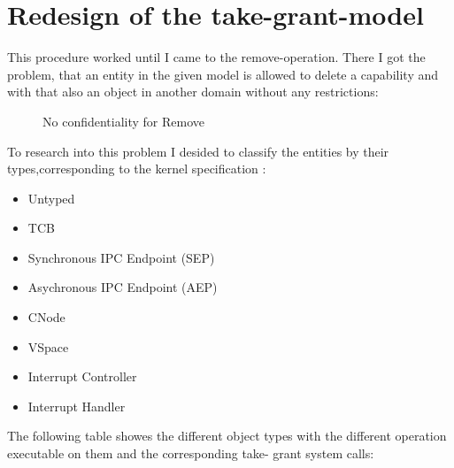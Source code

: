 \documentclass[pdftex,11pt,a4paper,twoside]{article}
\begin{document}
\section{Redesign of the take-grant-model}
This procedure worked until I came to the remove-operation. There I got the problem, that an entity in the given model is allowed to delete a capability and with that also an object in another domain without any restrictions:
\begin{figure}[H]
\caption{No confidentiality for Remove}
\end{figure}
To research into this problem I desided to classify the entities by their types,corresponding to the kernel specification \cite{Manual}:
\begin{itemize}
\item Untyped 
\item TCB
\item Synchronous IPC Endpoint (SEP)
\item Asychronous IPC Endpoint (AEP)
\item CNode
\item VSpace
\item Interrupt Controller 
\item Interrupt Handler
\end{itemize}
The following table showes the different object types with the different operation executable on them and the corresponding take- grant system calls: \\
\end{document}
